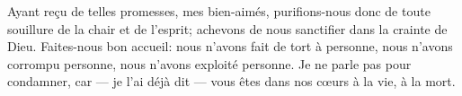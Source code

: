 Ayant reçu de telles promesses, mes bien-aimés,
	purifions-nous donc de toute souillure de la chair et de l’esprit;
	achevons de nous sanctifier dans la crainte de Dieu.
Faites-nous bon accueil: nous n’avons fait de tort à personne,
	nous n’avons corrompu personne, nous n’avons exploité personne.
Je ne parle pas pour condamner, car --- je l’ai déjà dit ---
	vous êtes dans nos cœurs à la vie, à la mort.

